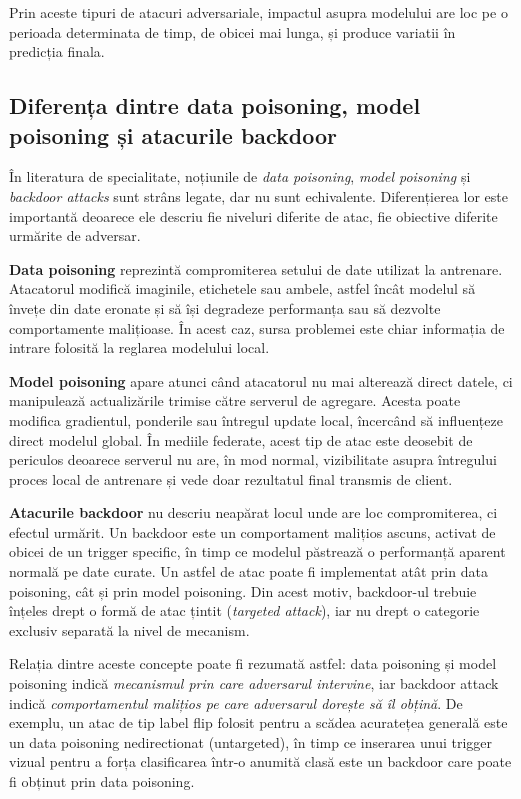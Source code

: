 \documentclass[../../main.tex]{subfiles}
\begin{document}
    Prin aceste tipuri de atacuri adversariale, impactul asupra modelului are loc pe o perioada determinata de timp, de obicei mai lunga, și produce variatii în
predicția finala.

    \subsection{Diferența dintre data poisoning, model poisoning și atacurile backdoor}

    În literatura de specialitate, noțiunile de \textit{data poisoning}, \textit{model poisoning} și \textit{backdoor attacks} sunt strâns legate, dar nu sunt echivalente. Diferențierea lor este importantă deoarece ele descriu fie niveluri diferite de atac, fie obiective diferite urmărite de adversar.

    \textbf{Data poisoning} reprezintă compromiterea setului de date utilizat la antrenare. Atacatorul modifică imaginile, etichetele sau ambele, astfel încât modelul să învețe din date eronate și să își degradeze performanța sau să dezvolte comportamente malițioase. În acest caz, sursa problemei este chiar informația de intrare folosită la reglarea modelului local.

    \textbf{Model poisoning} apare atunci când atacatorul nu mai alterează direct datele, ci manipulează actualizările trimise către serverul de agregare. Acesta poate modifica gradientul, ponderile sau întregul update local, încercând să influențeze direct modelul global. În mediile federate, acest tip de atac este deosebit de periculos deoarece serverul nu are, în mod normal, vizibilitate asupra întregului proces local de antrenare și vede doar rezultatul final transmis de client.

    \textbf{Atacurile backdoor} nu descriu neapărat locul unde are loc compromiterea, ci efectul urmărit. Un backdoor este un comportament malițios ascuns, activat de obicei de un trigger specific, în timp ce modelul păstrează o performanță aparent normală pe date curate. Un astfel de atac poate fi implementat atât prin data poisoning, cât și prin model poisoning. Din acest motiv, backdoor-ul trebuie înțeles drept o formă de atac țintit (\textit{targeted attack}), iar nu drept o categorie exclusiv separată la nivel de mecanism.

    Relația dintre aceste concepte poate fi rezumată astfel: data poisoning și model poisoning indică \textit{mecanismul prin care adversarul intervine}, iar backdoor attack indică \textit{comportamentul malițios pe care adversarul dorește să îl obțină}. De exemplu, un atac de tip label flip folosit pentru a scădea acuratețea generală este un data poisoning nedirectionat (untargeted), în timp ce inserarea unui trigger vizual pentru a forța clasificarea într-o anumită clasă este un backdoor care poate fi obținut prin data poisoning.
\end{document}
